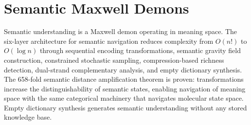 \chapter{Semantic Maxwell Demons}
\label{ch:semantic_maxwell}


\begin{chapterabstract}
Semantic understanding is a Maxwell demon operating in meaning space. The six-layer architecture for semantic navigation reduces complexity from $O(n!)$ to $O(\log n)$ through sequential encoding transformations, semantic gravity field construction, constrained stochastic sampling, compression-based richness detection, dual-strand complementary analysis, and empty dictionary synthesis. The 658-fold semantic distance amplification theorem is proven: transformations increase the distinguishability of semantic states, enabling navigation of meaning space with the same categorical machinery that navigates molecular state space. Empty dictionary synthesis generates semantic understanding without any stored knowledge base.
\end{chapterabstract}



